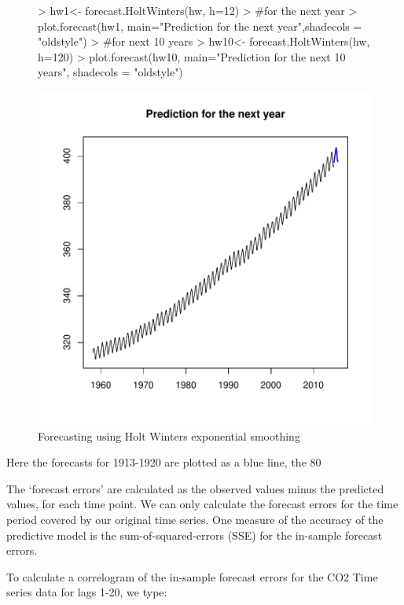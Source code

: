 \documentclass[11pt, a4paper]{article} %
\begin{document}
\begin{figure}[H]
\centering
\begin{Schunk}
\begin{Sinput}
> hw1<- forecast.HoltWinters(hw, h=12)
> #for the next year  
> plot.forecast(hw1, main="Prediction for the next year",shadecols = "oldstyle")
> #for next 10 years
> hw10<- forecast.HoltWinters(hw, h=120)
> plot.forecast(hw10, main="Prediction for the next 10 years", shadecols = "oldstyle")
\end{Sinput}
\end{Schunk}
\includegraphics{sweaveclean-020}
\caption{Forecasting using Holt Winters exponential smoothing}
\end{figure}

\noindent Here the forecasts for 1913-1920 are plotted as a blue line, the 80%

\noindent The ‘forecast errors’ are calculated as the observed values minus the predicted values, for each time point. We can only calculate the forecast errors for the time period covered by our original time series. One measure of the accuracy of the predictive model is the sum-of-squared-errors (SSE) for the in-sample forecast errors.

\noindent To calculate a correlogram of the in-sample forecast errors for the CO2 Time series data for lags 1-20, we type:
\end{document}
